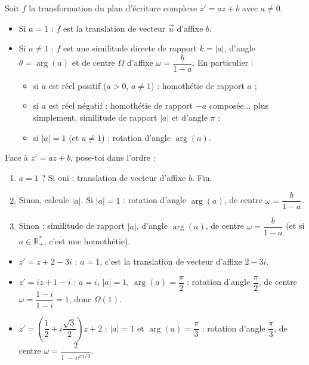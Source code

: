 \documentclass[11pt]{article}
\newcommand{\cle}[1]{{\popxbold\color{popdark}#1}}
\begin{document}
\begin{propriete}
Soit $f$ la transformation du plan d'écriture complexe $z' = az + b$ avec $a \neq 0$.
\begin{itemize}
\item Si $a = 1$ : $f$ est la \cle{translation} de vecteur $\vec{u}$ d'affixe $b$.
\item Si $a \neq 1$ : $f$ est une \cle{similitude directe} de rapport $k = |a|$, d'angle $\theta = \arg(a)$ et de centre $\Omega$ d'affixe $\omega = \dfrac{b}{1-a}$. En particulier :
\begin{itemize}
\item si $a$ est réel positif ($a > 0$, $a \neq 1$) : \cle{homothétie} de rapport $a$ ;
\item si $a$ est réel négatif : homothétie de rapport $-a$ composée... plus simplement, similitude de rapport $|a|$ et d'angle $\pi$ ;
\item si $|a| = 1$ (et $a \neq 1$) : \cle{rotation} d'angle $\arg(a)$.
\end{itemize}
\end{itemize}
\end{propriete}

\begin{methode}
Face à $z' = az + b$, pose-toi dans l'ordre :
\begin{enumerate}
\item $a = 1$ ? Si oui : translation de vecteur d'affixe $b$. Fin.
\item Sinon, calcule $|a|$. Si $|a| = 1$ : rotation d'angle $\arg(a)$, de centre $\omega = \dfrac{b}{1-a}$.
\item Sinon : similitude de rapport $|a|$, d'angle $\arg(a)$, de centre $\omega = \dfrac{b}{1-a}$ (et si $a \in \mathbb{R}_+^*$, c'est une homothétie).
\end{enumerate}
\end{methode}

\begin{exemplebox}
\begin{itemize}
\item $z' = z + 2 - 3i$ : $a = 1$, c'est la translation de vecteur d'affixe $2 - 3i$.
\item $z' = iz + 1 - i$ : $a = i$, $|a| = 1$, $\arg(a) = \dfrac{\pi}{2}$ : rotation d'angle $\dfrac{\pi}{2}$, de centre $\omega = \dfrac{1-i}{1-i} = 1$, donc $\Omega(1)$.
\item $z' = \left(\dfrac{1}{2} + i\dfrac{\sqrt{3}}{2}\right) z + 2$ : $|a| = 1$ et $\arg(a) = \dfrac{\pi}{3}$ : rotation d'angle $\dfrac{\pi}{3}$, de centre $\omega = \dfrac{2}{1 - e^{i\pi/3}}$.
\end{itemize}
\end{exemplebox}
\end{document}

